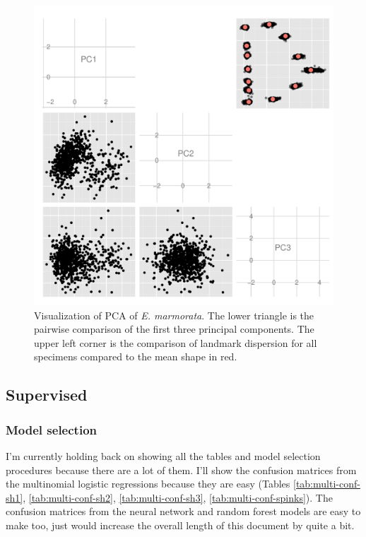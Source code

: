 \documentclass{article}\usepackage{graphicx, color}
\begin{document}
\begin{figure}[ht]
  \centering
  \includegraphics[width = \textwidth]{figure/gm}
  \caption{Visualization of PCA of \textit{E. marmorata}. The lower triangle is the pairwise comparison of the first three principal components. The upper left corner is the comparison of landmark dispersion for all specimens compared to the mean shape in red.}
  \label{fig:gm}
\end{figure}


\subsection{Supervised}

\subsubsection{Model selection}
%
%

I'm currently holding back on showing all the tables and model selection procedures because there are a lot of them. I'll show the confusion matrices from the multinomial logistic regressions because they are easy (Tables \ref{tab:multi-conf-sh1}, \ref{tab:multi-conf-sh2}, \ref{tab:multi-conf-sh3}, \ref{tab:multi-conf-spinks}). The confusion matrices from the neural network and random forest models are easy to make too, just would increase the overall length of this document by quite a bit.
\end{document}
